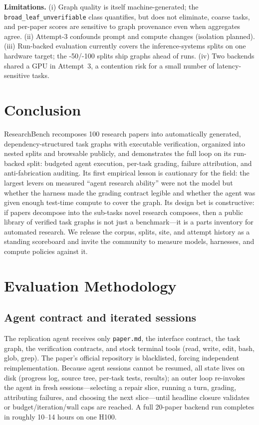 \documentclass{article}
\begin{document}
\textbf{Limitations.} (i) Graph quality is itself machine-generated; the
\texttt{broad\_leaf\_unverifiable} class quantifies, but does not eliminate,
coarse tasks, and per-paper scores are sensitive to graph provenance even
when aggregates agree. (ii) Attempt-3 confounds prompt and compute changes
(isolation planned). (iii) Run-backed evaluation currently covers the
inference-systems splits on one hardware target; the -50/-100 splits ship
graphs ahead of runs. (iv) Two backends shared a GPU in Attempt~3, a
contention risk for a small number of latency-sensitive tasks.

\section{Conclusion}

ResearchBench recomposes 100 research papers into automatically generated,
dependency-structured task graphs with executable verification, organized
into nested splits and browsable publicly, and demonstrates the full loop on
its run-backed split: budgeted agent execution, per-task grading, failure
attribution, and anti-fabrication auditing. Its first empirical lesson is
cautionary for the field: the largest levers on measured ``agent research
ability'' were not the model but whether the harness made the grading
contract legible and whether the agent was given enough test-time compute to
cover the graph. Its design bet is constructive: if papers decompose into
the sub-tasks novel research composes, then a public library of verified
task graphs is not just a benchmark---it is a parts inventory for automated
research. We release the corpus, splits, site, and attempt history as a
standing scoreboard and invite the community to measure models, harnesses,
and compute policies against it.

\section{Evaluation Methodology}
\label{sec:method}

\subsection{Agent contract and iterated sessions}

The replication agent receives only \texttt{paper.md}, the interface
contract, the task graph, the verification contracts, and stock terminal
tools (read, write, edit, bash, glob, grep). The paper's official repository
is blacklisted, forcing independent reimplementation. Because agent sessions
cannot be resumed, all state lives on disk (progress log, source tree,
per-task tests, results); an outer loop re-invokes the agent in fresh
sessions---selecting a repair slice, running a turn, grading, attributing
failures, and choosing the next slice---until headline closure validates or
budget/iteration/wall caps are reached. A full 20-paper backend run completes
in roughly 10--14 hours on one H100.
\end{document}
